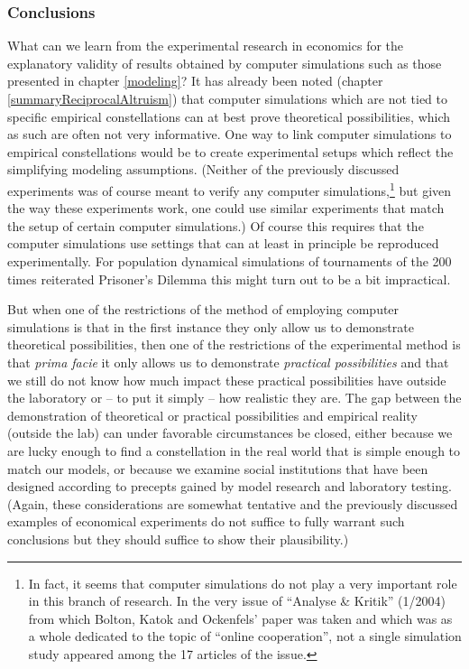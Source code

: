 \subsubsection{Conclusions}

What can we learn from the experimental research in economics for the
explanatory validity of results obtained by computer simulations such as those
presented in chapter \ref{modeling}? It has already been noted (chapter
\ref{summaryReciprocalAltruism}) that computer simulations which are not tied
to specific empirical constellations can at best prove theoretical
possibilities, which as such are often not very informative. One way to link
computer simulations to empirical constellations would be to create
experimental setups which reflect the simplifying modeling assumptions.
(Neither of the previously discussed experiments was of course meant to verify
any computer simulations,\footnote{In fact, it seems that computer simulations
  do not play a very important role in this branch of research. In the very
  issue of ``Analyse \& Kritik'' (1/2004) from which Bolton, Katok and
  Ockenfels' paper \cite[]{bolton-katok-ockenfels:2004} was taken and which
  was as a whole dedicated to the topic of ``online cooperation'', not a
  single simulation study appeared among the 17 articles of the issue.} but
given the way these experiments work, one could use similar experiments that
match the setup of certain computer simulations.) Of course this requires
that the computer simulations use settings that can at least in principle be
reproduced experimentally. For population dynamical simulations of tournaments
of the 200 times reiterated Prisoner's Dilemma this might turn out to be a bit
impractical.

But when one of the restrictions of the method of employing computer
simulations is that in the first instance they only allow us to demonstrate
theoretical possibilities, then one of the restrictions of the experimental
method is that {\em prima facie} it only allows us to demonstrate {\em
  practical possibilities} and that we still do not know how much impact these
practical possibilities have outside the laboratory or -- to put it simply --
how realistic they are. The gap between the demonstration of theoretical or
practical possibilities and empirical reality (outside the lab) can under
favorable circumstances be closed, either because we are lucky enough to find
a constellation in the real world that is simple enough to match our models,
or because we examine social institutions that have been designed according to
precepts gained by model research and laboratory testing. (Again, these
considerations are somewhat tentative and the previously discussed examples of
economical experiments do not suffice to fully warrant such conclusions but
they should suffice to show their plausibility.)

